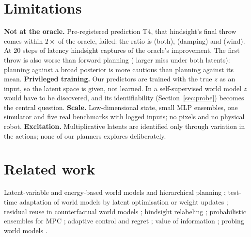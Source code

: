\documentclass[11pt]{article}
\begin{document}
\section{Limitations}
\label{sec:lim}
\textbf{Not at the oracle.} Pre-registered prediction T4, that hindsight's final throw comes within $2\times$ of the
oracle, failed: the ratio is \twOracleGapBoth{} (both), \twOracleGapDamp{} (damping) and \twOracleGapWind{} (wind). At
20 steps of latency hindsight captures \dlCapture{} of the oracle's improvement. The first throw is also worse than
forward planning (\twFirstBoth{} larger miss under both latents): planning against a broad posterior is more cautious than planning
against its mean. \textbf{Privileged training.} Our predictors are trained with the true $z$ as an input, so the latent
space is given, not learned. In a self-supervised world model \citep{lecun2022path,hjepa_2610_06805} $z$ would have to be
discovered, and its identifiability (Section~\ref{sec:probe}) becomes the central question. \textbf{Scale.}
Low-dimensional state, small MLP ensembles, one simulator and five real benchmarks with logged inputs; no pixels and no
physical robot. \textbf{Excitation.} Multiplicative latents are identified only through variation in the actions;
none of our planners explores deliberately.

\section{Related work}
Latent-variable and energy-based world models and hierarchical planning \citep{lecun2022path,hjepa_2610_06805};
test-time adaptation of world models by latent optimisation \citep{t2z_2610_22364} or weight updates
\citep{adajepa_2606_32026,jepattt_2610_00722}; residual reuse in counterfactual world models \citep{cwm_2611_24778};
hindsight relabeling \citep{andrychowicz2017her}; probabilistic ensembles for MPC \citep{chua2018pets}; adaptive control
and regret \citep{laiwei1982,abbasi2011,simchowitz2020,cassel2020,astrom_wittenmark}; value of information
\citep{blackwell1953}; probing world models \citep{li2023othello,probing_rl_wm_2603_21546}.
\end{document}
